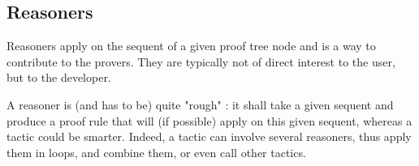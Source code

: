 \subsection{Reasoners}
\label{ref:reasoners}

Reasoners apply on the sequent of a given proof tree node and is a way to contribute to the provers.  They are typically not of direct interest to the user, but to the developer.

A reasoner is (and has to be) quite "rough" : it shall take a given sequent and produce a proof rule that will (if possible) apply on this given sequent, whereas a tactic could be smarter. Indeed, a tactic can involve several reasoners, thus apply them in loops, and combine them, or even call other tactics.

